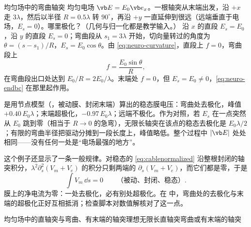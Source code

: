 \begin{example}[label=ex:neuro-bend]{均匀场中的弯曲轴突}
均匀电场 $\vb E=E_0\vb e_x$。一根轴突从末端出发，沿 $+x$ 走 $3\lambda$，然后以半径 $R=0.5\lambda$ 转 $90^\circ$，再沿 $+y$ 一直延伸到很远（远端垂直于电场，$E_s=0$）。哪里极化？（几何与归一化都是教学输入。）
\solution
沿 $x$ 的直段 $E_s=E_0$，沿 $y$ 的直段 $E_s=0$；弯曲段从 $s_1=3\lambda$ 开始，切向量转过的角度为 $\theta=(s-s_1)/R$，$E_s=E_0\cos\theta$。由 \eqref{eq:neuro-curvature}，直段上 $f=0$，弯曲段上
\begin{equation*}
f=\frac{E_0\sin\theta}{R},
\end{equation*}
在弯曲段出口处达到 $E_0/R=2E_0/\lambda$。末端处 $f=0$，但 $E_s=E_0\ne0$，\eqref{eq:neuro-endbc} 在那里起作用。

 是用节点模型（，被动膜、封闭末端）算出的稳态膜电压：弯曲处去极化，峰值 $+0.40\,E_0\lambda$；末端超极化，$-0.97\,E_0\lambda$；远端不极化。作为对照，若 $E_s$ 在一点突然从 $E_0$ 跳到零（相当于 $R\to0$ 的急弯），无限长轴突在该点的稳态去极化是 $E_0\lambda/2$；有限的弯曲半径把驱动分摊到一段长度上，峰值略低。整个过程中 $|\vb E|$ 处处相同——没有任何一处是“电场最强的地方”。
\end{example}


这个例子还显示了一条一般规律。对稳态的 \eqref{eq:cablenormalized} 沿整根封闭的轴突积分，$\lambda^2\partial_s^2(V_m+V_e)$ 的积分只剩两端的 $\partial_s(V_m+V_e)$，而它们都是零，于是
\begin{equation}
\int V_m\,\dd s=0\qquad\text{（被动、封闭、稳态）}.
\end{equation}
膜上的净电流为零：一处去极化，必有别处超极化。在 中，弯曲处的去极化与末端的超极化正好互相抵消；检查脚本对数值解核对了这一点。

\begin{compare}{均匀场中的直轴突与弯曲、有末端的轴突}{理想无限长直轴突}{弯曲或有末端的轴突}
\end{compare}

